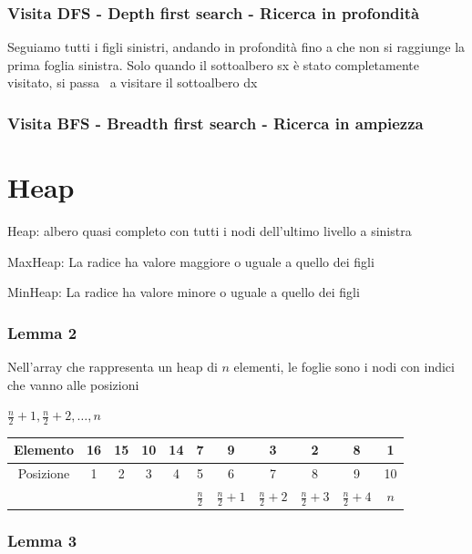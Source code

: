 \documentclass[tikz]{article}
\begin{document}
{{{\subsubsection{Visita DFS - Depth first search - Ricerca in profondità}

{Seguiamo tutti i figli sinistri, andando in profondità fino a che non si raggiunge la prima foglia sinistra. Solo quando il sottoalbero sx è stato completamente visitato, si passa ~a visitare il sottoalbero dx}



\subsubsection{Visita BFS - Breadth first search - Ricerca in ampiezza}

\section{Heap}

{Heap: albero quasi completo con tutti i nodi dell'ultimo livello a sinistra}

{MaxHeap: La radice ha valore maggiore o uguale a quello dei figli}

{MinHeap: La radice ha valore minore o uguale a quello dei figli}

\subsubsection{Lemma 2}

{Nell'array che rappresenta un heap di $n$ elementi, le foglie sono i nodi con indici che vanno alle posizioni}

$\frac{n}{2}+1,\frac{n}{2}+2,\ldots,n$



\begin{tabular}{|c|c|c|c|c|c|c|c|c|c|c|}
\hline 
Elemento & 16 & 15 & 10 & 14 & 7 & 9 & 3 & 2 & 8 & 1 \\ 
\hline 
Posizione & 1 & 2 & 3 & 4 & 5 & 6 & 7 & 8 & 9 & 10 \\ 
\hline 
 &  &  &  &  & $\frac{n}{2}$ & $\frac{n}{2}+1$ & $\frac{n}{2}+2$ & $\frac{n}{2}+3$ & $\frac{n}{2}+4$ & $n$ \\ 
\hline 
\end{tabular} 

\subsubsection{Lemma 3}

}}}
\end{document}
